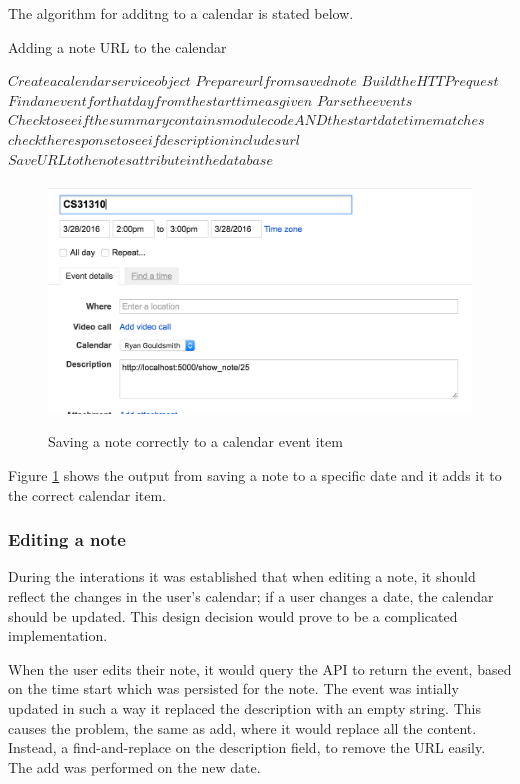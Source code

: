 The algorithm for additng to a calendar is stated below.
\begin{algorithm}
  \caption{Adding a note URL to the calendar}
  \label{algorithm:threshold1}
  \begin{algorithmic}[1]
      \State $Create a calendar service object$
      \State $Prepare url from saved note$
      \State $Build the HTTP request$
      \State $Find an event for that day from the start time as given$
      \State $Parse the events$
      \State $Check to see if the summary contains module code AND the start date time matches$
        \State $check the response to see if description includes url$
        \State $Save URL to the notes attribute in the database$
      \EndIf
  \end{algorithmic}
\end{algorithm}

\begin{figure}[H]
  \centering
  \includegraphics[scale=0.3]{images/saved_to_calendar}
  \label{fig:saved_to_calendar}
  \caption{Saving a note correctly to a calendar event item}
\end{figure}

Figure \ref{fig:saved_to_calendar} shows the output from saving a note to a specific date and it adds it to the correct calendar item.

\subsubsection{Editing a note}
During the interations it was established that when editing a note, it should reflect the changes in the user's calendar; if a user changes a date, the calendar should be updated. This design decision would prove to be a complicated implementation.

When the user edits their note, it would query the API to return the event, based on the time start which was persisted for the note. The event was intially updated in such a way it replaced the description with an empty string. This causes the problem, the same as add, where it would replace all the content. Instead, a find-and-replace on the description field, to remove the URL easily. The add was performed on the new date.

